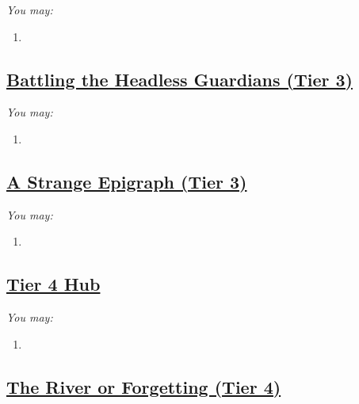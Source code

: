 \documentclass[sheet]{GL2020}
\begin{document}
\begingroup
\itshape
You may:
\begin{enumerate}[A]
  \item 
\end{enumerate}
\endgroup

\clearpage

\begin{center}\section*{\underline{Battling the Headless Guardians (Tier 3)}}\end{center}
\label{BattleHeadlessGuardians}

\begingroup
\itshape
You may:
\begin{enumerate}[A]
  \item 
\end{enumerate}
\endgroup

\clearpage

\begin{center}\section*{\underline{A Strange Epigraph (Tier 3)}}\end{center}
\label{StrangeEpigraph}

\begingroup
\itshape
You may:
\begin{enumerate}[A]
  \item 
\end{enumerate}
\endgroup

\clearpage

\begin{center}\section*{\underline{Tier 4 Hub}}\end{center}
\label{TierFourHub}

\begingroup
\itshape
You may:
\begin{enumerate}[A]
  \item 
\end{enumerate}
\endgroup

\clearpage

\begin{center}\section*{\underline{The River or Forgetting (Tier 4)}}\end{center}
\label{RiverofForgetting}
\end{document}
